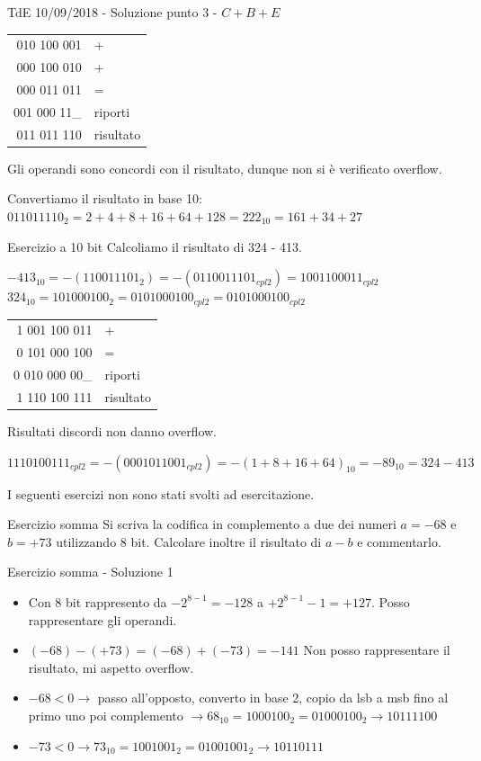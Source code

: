 \documentclass[9pt, format=169, handout]{beamer}
\begin{document}
\begin{frame}{TdE 10/09/2018 - Soluzione punto 3 - $C+B+E$}
\begin{tabular}{r|l}
	010 100 001 & + \\
	000 100 010 & + \\
	000 011 011 &	=	\\
	\hline
	001 000 11\_&	riporti\\
	011 011 110	& risultato
\end{tabular}

\pause
Gli operandi sono concordi con il risultato, dunque non si è verificato overflow.

\pause
Convertiamo il risultato in base 10: $011011110_2 = 2+4+8+16+64+128 = 222_{10} = 161+34+27$
\end{frame}

\begin{frame}{Esercizio a 10 bit}
Calcoliamo il risultato di 324 - 413.

\pause
$-413_{10} = -(110011101_2) = -(0110011101_{cpl2}) = 1001100011_{cpl2}$\\
$324_{10} = 101000100_2 = 0101000100_{cpl2}        = 0101000100_{cpl2}$

\pause
\begin{tabular}{r|l}
	1 001 100 011 & + \\
	0 101 000 100 & = \\
	\hline
	0 010 000 00\_&	riporti\\
    1 110 100 111 & risultato
\end{tabular}

\pause
Risultati discordi non danno overflow.

\pause
$1110100111_{cpl2} = -(0001011001_{cpl2}) = -(1+8+16+64)_{10} = -89_{10} = 324-413$
\end{frame}

\begin{frame}
I seguenti esercizi non sono stati svolti ad esercitazione.
\end{frame}


\begin{frame}{Esercizio somma}
Si scriva la codifica in complemento a due dei numeri $a=-68$ e $b=+73$ utilizzando 8 bit.
Calcolare inoltre il risultato di $a-b$ e commentarlo.
\end{frame}

\begin{frame}{Esercizio somma - Soluzione 1}
\begin{itemize}[<+->]
\item Con 8 bit rappresento da $-2^{8-1} = -128$ a $+2^{8-1}-1 = +127$. Posso rappresentare gli operandi.
\item $(-68) - (+73) = (-68) + (-73) = -141$ Non posso rappresentare il risultato, mi aspetto overflow.
\item $-68 < 0 \rightarrow$ passo all'opposto, converto in base 2, copio da lsb a msb fino al primo uno poi complemento $\rightarrow 68_{10} = 1000100_2 = 01000100_2 \rightarrow 10111100$
\item $-73 < 0 \rightarrow 73_{10} = 1001001_2 = 01001001_2 \rightarrow 10110111$
\end{itemize}
\end{frame}
\end{document}
